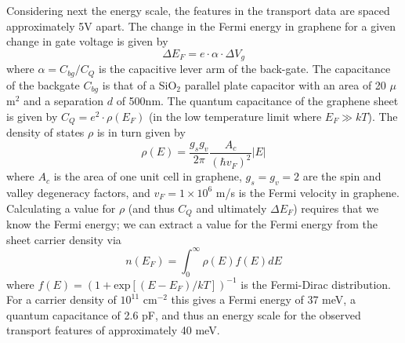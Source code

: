 \documentclass[edeposit,fullpage,draftthesis]{uiucthesis2009}
\begin{document}
            Considering next the energy scale, the features in the transport data are spaced approximately 5V apart.
            The change in the Fermi energy in graphene for a given change in gate voltage is given by
            \begin{equation}
                \Delta E_F = e \cdot \alpha \cdot \Delta V_g
            \end{equation}
            where $\alpha = C_{bg} / C_Q$ is the capacitive lever arm of the back-gate. The capacitance of the backgate $C_{bg}$
            is that of a SiO$_2$ parallel plate capacitor with an area of 20 $\mu$m$^2$ and a separation $d$ of 500nm.
            The quantum capacitance of the graphene sheet is given by $C_Q = e^2 \cdot \rho(E_F)$ \cite{fang2007carrier}
            (in the low temperature limit where $E_F \gg kT$). The density of states $\rho$ is in turn given by \cite{CastroNeto2009}
            \begin{equation}
                \rho(E) = \frac{g_s g_v}{2 \pi} \frac{A_c}{(\hbar v_F)^2} |E|   
            \end{equation}
            where $A_c$ is the area of one unit cell in graphene, $g_s = g_v = 2$ are the spin and valley degeneracy
            factors, and $v_F = 1 \times 10^6 $ m/s is the Fermi velocity in graphene.
            Calculating a value for $\rho$ (and thus $C_Q$ and ultimately $\Delta E_F$) 
            requires that we know the Fermi energy; we can extract
            a value for the Fermi energy from the sheet carrier density via
            \begin{equation}
                n(E_F) = \int_{0}^{\infty} \rho(E) f(E) dE
            \end{equation}
            where $f(E) = (1 + \text{exp}[(E - E_F) / kT])^{-1}$ is the Fermi-Dirac distribution. For a carrier density
            of $10^{11}$ cm$^{-2}$ this gives a Fermi energy of 37 meV, a quantum capacitance of 2.6 pF,
            and thus an energy scale for the observed transport features of approximately 40 meV.
            
\end{document}
